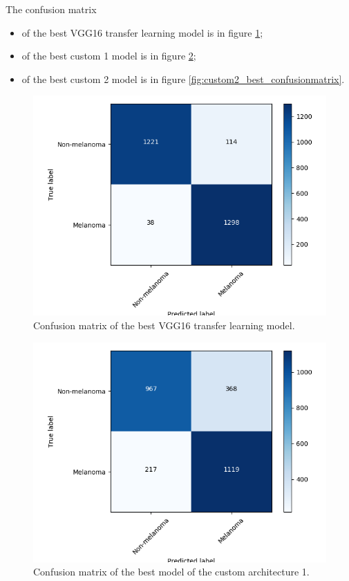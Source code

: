 The confusion matrix

\begin{itemize}
    \item of the best VGG16 transfer learning model is in figure \ref{fig:vgg16_best_confusionmatrix};
    \item of the best custom 1 model is in figure \ref{fig:custom1_best_confusionmatrix};
    \item of the best custom 2 model is in figure \ref{fig:custom2_best_confusionmatrix}.
\end{itemize}

\begin{figure}[ht]
    \centering
    \includegraphics[width=1.0\textwidth]{figs/vgg16_best_confusionmatrix.png}
    \caption{Confusion matrix of the best VGG16 transfer learning model.}
    \label{fig:vgg16_best_confusionmatrix}
\end{figure}

\begin{figure}[ht]
    \centering
    \includegraphics[width=1.0\textwidth]{figs/custom1_best_confusionmatrix.png}
    \caption{Confusion matrix of the best model of the custom architecture 1.}
    \label{fig:custom1_best_confusionmatrix}
\end{figure}

